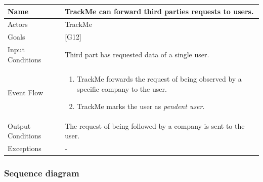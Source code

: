 \documentclass{article}
\begin{document}
\begin{center}
    \begin{tabular}{ | l | p{10cm} |}
    \hline
    Name & TrackMe can forward third parties requests to users. \\ \hline
    Actors & TrackMe\\ \hline
   	Goals & {[G12]}\\ \hline
    Input Conditions & Third part has requested data of a single user.\\ \hline
    Event Flow & \begin{enumerate}
    	\item TrackMe forwards the request of being observed by a specific company to the user.
    	\item TrackMe marks the user as \emph{pendent user}.
    \end{enumerate} \\ \hline
    Output Conditions & The request of being followed by a company is sent to the user. \\ \hline
    Exceptions & -    \\ \hline
    \end{tabular}
\end{center}\newpage

\subsubsection{Sequence diagram}
\end{document}
